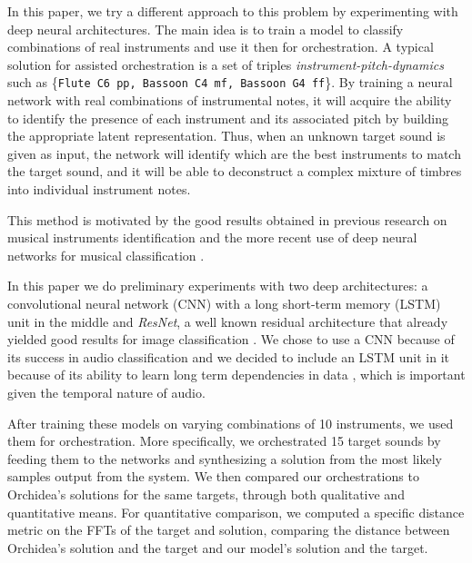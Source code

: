 \documentclass[runningheads,a4paper]{llncs}
\begin{document}
In this paper, we try a different approach to this problem by experimenting with deep neural architectures. The main idea is to train a model to classify combinations of real instruments and use it then for orchestration. A typical solution for assisted orchestration is a set of triples \emph{instrument-pitch-dynamics} such as \{\texttt{Flute C6 pp, Bassoon C4 mf, Bassoon G4 ff}\}. By training a neural network with real combinations of instrumental notes, it will acquire the ability to identify the presence of each instrument and its associated pitch by building the appropriate latent representation. Thus, when an unknown target sound is given as input, the network will identify which are the best instruments to match the target sound, and it will be able to  deconstruct a complex mixture of timbres into individual instrument notes.


This method is motivated by the good results obtained in previous research on musical instruments identification \cite{Benetos07, Kitahara05} and the more recent use of deep neural networks for musical classification \cite{lostanlen16, Bian19}. 

In this paper we do preliminary experiments with two deep architectures: a convolutional neural network (CNN) with a long short-term memory (LSTM) unit in the middle and \emph{ResNet}, a well known residual architecture that already yielded good results for image classification \cite{He15}. We chose to use a CNN because of its success in audio classification \cite{Hershey17} and we decided to include an LSTM unit in it because of its ability to learn long term dependencies in data \cite{Hochreiter97}, which is important given the temporal nature of audio.

After training these models on varying combinations of 10 instruments, we used them for orchestration. More specifically, we orchestrated 15 target sounds by feeding them to the networks and synthesizing a solution from the most likely samples output from the system. We then compared our orchestrations to Orchidea's solutions for the same targets, through both qualitative and quantitative means. For quantitative comparison, we computed a specific distance metric on the FFTs of the target and solution, comparing the distance between Orchidea's solution and the target and our model's solution and the target.
\end{document}
